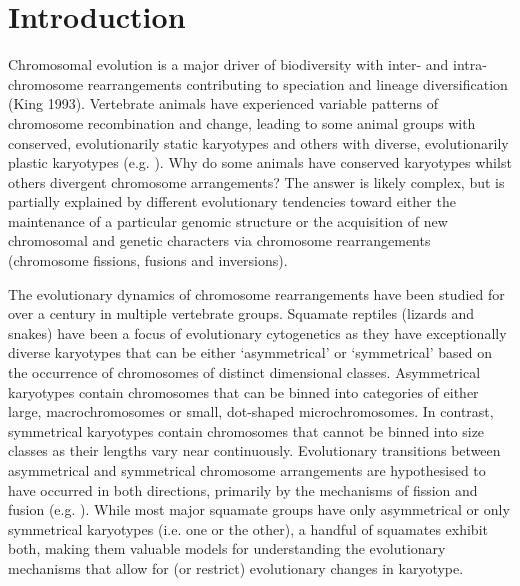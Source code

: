 \documentclass[a4paper, 12pt]{article}
\begin{document}

\section{Introduction}\label{main}

Chromosomal evolution is a major driver of biodiversity with inter- and intra-chromosome rearrangements contributing to speciation and lineage diversification\cite{pellestor2020chromoanagenesis} (King 1993). 
Vertebrate animals have experienced variable patterns of chromosome recombination and change, leading to some animal groups with conserved, evolutionarily static karyotypes and others with diverse, evolutionarily plastic karyotypes (e.g. \cite{graphodatsky2011genome,neto2011extensive,mezzasalma2019changes,degrandi2020distribution,mayrose2021evolution}).
Why do some animals have conserved karyotypes whilst others divergent chromosome arrangements? 
The answer is likely complex, but is partially explained by different evolutionary tendencies toward either the maintenance of a particular genomic structure or the acquisition of new chromosomal and genetic characters via chromosome rearrangements (chromosome fissions, fusions and inversions\cite{crombach2007chromosome,amorim2021new}).

The evolutionary dynamics of chromosome rearrangements have been studied for over a century in multiple vertebrate groups\cite{damas2021vertebrate}. 
Squamate reptiles (lizards and snakes) have been a focus of evolutionary cytogenetics as they have exceptionally diverse karyotypes that can be either ‘asymmetrical’ or ‘symmetrical’ based on the occurrence of chromosomes of distinct dimensional classes\cite{stebbins1950chapter,white1973}. 
Asymmetrical karyotypes contain chromosomes that can be binned into categories of either large, macrochromosomes or small, dot-shaped microchromosomes.
In contrast, symmetrical karyotypes contain chromosomes that cannot be binned into size classes as their lengths vary near continuously. 
Evolutionary transitions between asymmetrical and symmetrical chromosome arrangements are hypothesised to have occurred in both directions, primarily by the mechanisms of fission and fusion (e.g. \cite{olmo2008trends,srikulnath2015karyotype}). 
While most major squamate groups have only asymmetrical or only symmetrical karyotypes (i.e. one or the other), a handful of squamates exhibit both\cite{mezzasalma2021lizards}, making them valuable models for understanding the evolutionary mechanisms that allow for (or restrict) evolutionary changes in karyotype.    
\end{document}
